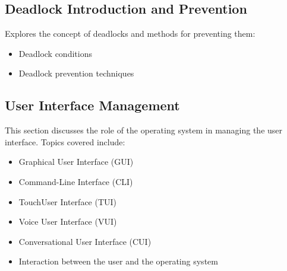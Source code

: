 \documentclass[12pt]{article}
\begin{document}
\subsection{Deadlock Introduction and Prevention}
Explores the concept of deadlocks and methods for preventing them:
\begin{itemize}
    \item Deadlock conditions
    \item Deadlock prevention techniques
\end{itemize}

\subsection{User Interface Management}
This section discusses the role of the operating system in managing the user interface. Topics covered include:
\begin{itemize}
    \item Graphical User Interface (GUI)
    \item Command-Line Interface (CLI)
    \item TouchUser Interface (TUI)
    \item Voice User Interface (VUI)
    \item Conversational User Interface (CUI)
    \item Interaction between the user and the operating system
\end{itemize}
\end{document}
